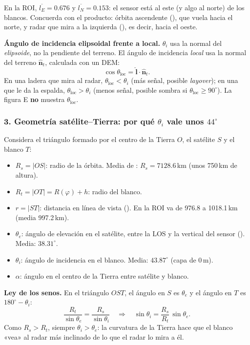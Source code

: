 \documentclass[11pt,a4paper]{article}
\begin{document}
En la ROI, $\overline{l_E} = 0.676$ y $\overline{l_N} = 0.153$: el sensor está al este (y algo al norte) de los blancos. Concuerda con
el producto: órbita ascendente (), que vuela hacia el norte, y radar que mira a la izquierda
(), es decir, hacia el oeste.

\textbf{Ángulo de incidencia elipsoidal frente a local.} $\theta_i$ usa la normal del \emph{elipsoide}, no la pendiente del terreno. El
ángulo de incidencia \emph{local} usa la normal del terreno $\hat{\mathbf n}_t$, calculada con un DEM:
\begin{equation}
  \cos\theta_{\text{loc}} = \hat{\mathbf l}\cdot\hat{\mathbf n}_t .
\end{equation}
En una ladera que mira al radar, $\theta_{\text{loc}} < \theta_i$ (más señal, posible \emph{layover}); en una que le da la espalda,
$\theta_{\text{loc}} > \theta_i$ (menos señal, posible sombra si $\theta_{\text{loc}} \ge 90^\circ$). La figura E \textbf{no} muestra
$\theta_{\text{loc}}$.

\subsubsection*{3. Geometría satélite--Tierra: por qué $\theta_i$ vale unos $44^\circ$}

Considera el triángulo formado por el centro de la Tierra $O$, el satélite $S$ y el blanco $T$:
\begin{itemize}
  \item $R_s = |OS|$: radio de la órbita. Media de : $R_s = 7128.6$\,km (unos 750\,km de altura).
  \item $R_t = |OT| = R(\varphi) + h$: radio del blanco.
  \item $r = |ST|$: distancia en línea de vista (). En la ROI va de 976.8 a 1018.1\,km (media 997.2\,km).
  \item $\theta_e$: ángulo de elevación en el satélite, entre la LOS y la vertical del sensor (). Media:
        $38.31^\circ$.
  \item $\theta_i$: ángulo de incidencia en el blanco. Media: $43.87^\circ$ (capa de 0\,m).
  \item $\alpha$: ángulo en el centro de la Tierra entre satélite y blanco.
\end{itemize}

\textbf{Ley de los senos.} En el triángulo $OST$, el ángulo en $S$ es $\theta_e$ y el ángulo en $T$ es $180^\circ - \theta_i$:
\begin{equation}
  \frac{R_t}{\sin\theta_e} = \frac{R_s}{\sin\theta_i}
  \quad\Longrightarrow\quad
  \sin\theta_i = \frac{R_s}{R_t}\,\sin\theta_e .
  \label{eq:senos}
\end{equation}
Como $R_s > R_t$, siempre $\theta_i > \theta_e$: la curvatura de la Tierra hace que el blanco «vea» al radar más inclinado de lo que
el radar lo mira a él.
\end{document}
